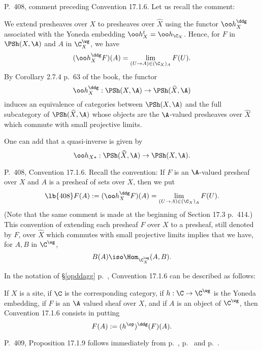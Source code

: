 \documentclass[12pt]{article}
\theoremstyle{remark}
\theoremstyle{definition}
\begin{document}
%

\begin{s}
P.~408, comment preceding Convention 17.1.6. Let us recall the comment: 

We extend presheaves over $X$ to presheaves over $\widehat X$ using the functor $\oo h_X^\ddg$ associated with the Yoneda embedding $\oo h_X^t=\oo h_{\C_X}$. Hence, for $F$ in $\PSh(X,\A)$ and $A$ in $\C_X^\wg$, we have 
$$
(\oo h_X^\ddg F)(A)=\lim_{(U\to A)\in(\C_X)_A}F(U).
$$ 
By Corollary 2.7.4 p.~63 of the book, the functor 
$$
\oo h_X^\ddg:\PSh(X,\A)\to\PSh(\widehat X,\A)
$$ 
induces an equivalence of categories between $\PSh(X,\A)$ and the full subcategory of $\PSh(\widehat X,\A)$ whose objects are the $\A$-valued presheaves over $\widehat X$ which commute with small projective limits. 

One can add that a quasi-inverse is given by 
$$
\oo h_{X*}:\PSh(\widehat X,\A)\to\PSh(X,\A). 
$$ 
\end{s}

%

\begin{s}
P.~408, Convention 17.1.6. Recall the convention: If $F$ is an $\A$-valued presheaf over $X$ and $A$ is a presheaf of sets over $X$, then we put 
\begin{equation}\lb{408} 
F(A):=(\oo h_X^\ddg F)(A)=\lim_{(U\to A)\in(\C_X)_A}F(U).
\end{equation} 
(Note that the same comment is made at the beginning of Section 17.3 p.~414.) This convention of extending each presheaf $F$ over $X$ to a presheaf, still denoted by $F$, over $\widehat X$ which commutes with small projective limits implies that we have, for $A,B$ in $\C^\wg$, 
$$
B(A)\iso\Hom_{\C_X^\wg}(A,B).
$$ 

In the notation of \S\ref{opddagg} p.~, Convention 17.1.6 can be described as follows:

If $X$ is a site, if $\C$ is the corresponding category, if $h:\C\to\C^\wg$ is the Yoneda embedding, if $F$ is an $\A$ valued sheaf over $X$, and if $A$ is an object of $\C^\wg$, then Convention 17.1.6 consists in putting 
$$
F(A):=(h^{\op})^\ddg(F)(A).
$$ 
\end{s}

%

\begin{s}
P.~409, Proposition 17.1.9 follows immediately from  p.~,  p.~ and  p.~.
\end{s}
\end{document}
